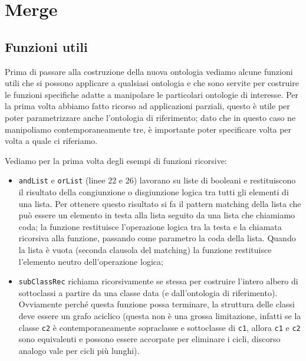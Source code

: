 \section{Merge}
\subsection{Funzioni utili}
Prima di passare alla costruzione della nuova ontologia vediamo alcune funzioni utili che si possono applicare a qualsiasi ontologia e che sono servite per costruire le funzioni specifiche adatte a manipolare le particolari ontologie di interesse.
Per la prima volta abbiamo fatto ricorso ad applicazioni parziali, questo è utile per poter parametrizzare anche l'ontologia di riferimento; dato che in questo caso ne manipoliamo contemporaneamente tre, è importante poter specificare volta per volta a quale ci riferiamo.

Vediamo per la prima volta degli esempi di funzioni ricorsive:
\begin{itemize}
	\item \verb|andList| e \verb|orList| (linee 22 e 26) lavorano su liste di booleani e restituiscono il risultato della congiunzione o disgiunzione logica tra tutti gli elementi di una lista. Per ottenere questo risultato si fa il pattern matching della lista che può essere un elemento in testa alla lista seguito da una lista che chiamiamo coda; la funzione restituisce l'operazione logica tra la testa e la chiamata ricorsiva alla funzione, passando come parametro la coda della lista. Quando la lista è vuota (seconda clausola del matching) la funzione restituisce l'elemento neutro dell'operazione logica;
	\item \verb|subClassRec| richiama ricorsivamente se stessa per costruire l'intero albero di sottoclassi a partire da una classe data (e dall'ontologia di riferimento). Ovviamente perché questa funzione possa terminare, la struttura delle classi deve essere un grafo aciclico (questa non è una grossa limitazione, infatti se la classe \verb|c2| è contemporaneamente sopraclasse e sottoclasse di \verb|c1|, allora \verb|c1| e \verb|c2| sono equivalenti e possono essere accorpate per eliminare i cicli, discorso analogo vale per cicli più lunghi).
\end{itemize}

